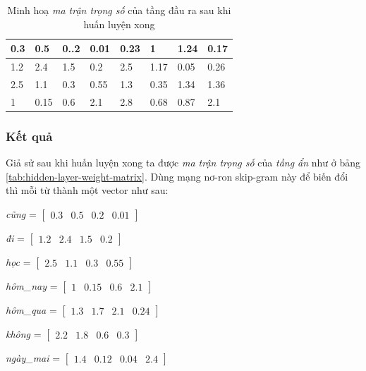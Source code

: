 \begin{table}[!h]
\centering
\begin{tabular}{|l|l|l|l|l|l|l|l|}
\hline
0.3 & 0.5  & 0..2 & 0.01 & 0.23 & 1    & 1.24 & 0.17 \\ \hline
1.2 & 2.4  & 1.5  & 0.2  & 2.5  & 1.17 & 0.05 & 0.26 \\ \hline
2.5 & 1.1  & 0.3  & 0.55 & 1.3  & 0.35 & 1.34 & 1.36 \\ \hline
1   & 0.15 & 0.6  & 2.1  & 2.8  & 0.68 & 0.87 & 2.1  \\ \hline
\end{tabular}
\caption{Minh hoạ \textit{ma trận trọng số} của tầng đầu ra sau khi huấn luyện xong}
\end{table}

\subsubsection{Kết quả}
Giả sử sau khi huấn luyện xong ta được \textit{ma trận trọng số} của \textit{tầng ẩn} như ở bảng \ref{tab:hidden-layer-weight-matrix}. Dùng mạng nơ-ron skip-gram này để biến đổi thì mỗi từ thành một vector như sau:

\textit{cũng} = $\begin{bmatrix}
        0.3 & 0.5 & 0.2 & 0.01
    \end{bmatrix}$

\textit{đi} = $\begin{bmatrix}
        1.2 & 2.4 & 1.5 & 0.2
    \end{bmatrix}$

\textit{học} = $\begin{bmatrix}
        2.5 & 1.1 & 0.3 & 0.55
    \end{bmatrix}$

\textit{hôm\_nay} = $\begin{bmatrix}
        1 & 0.15 & 0.6 & 2.1
    \end{bmatrix}$

\textit{hôm\_qua} = $\begin{bmatrix}
        1.3 & 1.7 & 2.1 & 0.24
    \end{bmatrix}$

\textit{không} = $\begin{bmatrix}
        2.2 & 1.8 & 0.6 & 0.3
    \end{bmatrix}$

\textit{ngày\_mai} = $\begin{bmatrix}
        1.4 & 0.12 & 0.04 & 2.4
    \end{bmatrix}$

